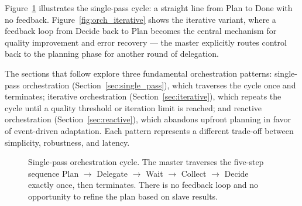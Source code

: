 Figure~\ref{fig:orch_single} illustrates the single-pass cycle: a straight line from Plan to Done with no feedback. Figure~\ref{fig:orch_iterative} shows the iterative variant, where a feedback loop from Decide back to Plan becomes the central mechanism for quality improvement and error recovery — the master explicitly routes control back to the planning phase for another round of delegation.

The sections that follow explore three fundamental orchestration patterns: single-pass orchestration (Section~\ref{sec:single_pass}), which traverses the cycle once and terminates; iterative orchestration (Section~\ref{sec:iterative}), which repeats the cycle until a quality threshold or iteration limit is reached; and reactive orchestration (Section~\ref{sec:reactive}), which abandons upfront planning in favor of event-driven adaptation. Each pattern represents a different trade-off between simplicity, robustness, and latency.

\begin{figure}[t]
\centering
{}
\caption{Single-pass orchestration cycle. The master traverses the five-step sequence Plan $\to$ Delegate $\to$ Wait $\to$ Collect $\to$ Decide exactly once, then terminates. There is no feedback loop and no opportunity to refine the plan based on slave results.}
\label{fig:orch_single}
\end{figure}

